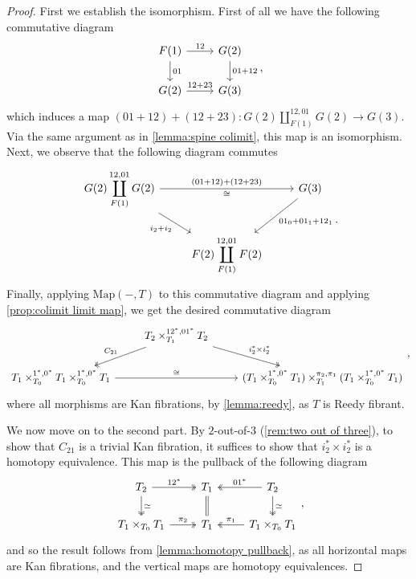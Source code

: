 \documentclass[11pt, a4paper]{amsart}
\newcommand{\Map}{\mathrm{Map}}
\theoremstyle{definition}
\theoremstyle{remark}
\numberwithin{equation}{section}
\begin{document}
\begin{proof}
  First we establish the isomorphism. First of all we have the following commutative diagram
  \[
  \begin{tikzcd}
   F(1) \arrow[r, "12"] \arrow[d, "01"] & G(2) \arrow[d, "01 + 12"] \\
   G(2) \arrow[r, "12 + 23"] & G(3) 
  \end{tikzcd}, 
  \]
  which induces a map $(01 + 12) + (12 + 23)\colon G(2) \coprod^{12,01}_{F(1)} G(2) \to G(3)$. Via the same argument as in \cref{lemma:spine colimit}, this map is an isomorphism. Next, we observe that the following diagram commutes
  \[ 
  \begin{tikzcd}
   \displaystyle G(2) \coprod^{12,01}_{F(1)} G(2) \arrow[dr, "i_2 + i_2"'] \arrow[rr, "\cong"', "(01 + 12) + (12 + 23)"] & & G(3) \arrow[dl, "01_0 + 01_1 + 12_1"] \\ 
   & \displaystyle F(2) \coprod_{F(1)}^{12,01} F(2)  
  \end{tikzcd}.
  \] 
   Finally, applying $\Map(-,T)$ to this commutative diagram and applying \cref{prop:colimit limit map}, we get the desired commutative diagram
 \[
 \begin{tikzcd}
  & T_2 \times_{T_1}^{12^*,01^*} T_2 \arrow[dl, "C_{21}"', twoheadrightarrow] \arrow[dr, "i_2^* \times i_2^*", twoheadrightarrow] & \\ 
  T_1 \times^{1^*,0^*}_{T_0} T_1 \times^{1^*,0^*}_{T_0} T_1 \arrow[rr, "\cong"] & & (T_1 \times^{1^*,0^*}_{T_0} T_1) \times^{\pi_2, \pi_1}_{T_1} (T_1 \times^{1^*,0^*}_{T_0} T_1)
 \end{tikzcd},
 \]
 where all morphisms are Kan fibrations,  by \cref{lemma:reedy}, as $T$ is Reedy fibrant.
 
 We now move on to the second part. By $2$-out-of-$3$ (\cref{rem:two out of three}), to show that $C_{21}$ is a trivial Kan fibration, it suffices to show that $i_2^* \times i_2^*$ is a homotopy equivalence. This map is the pullback of the following diagram 
 \[ 
 \begin{tikzcd}
  T_2 \arrow[r, twoheadrightarrow, "12^*"] \arrow[d, "\simeq", twoheadrightarrow] & T_1 \arrow[d, equal] & T_2 \arrow[l, twoheadrightarrow, "01^*"'] \arrow[d, "\simeq", twoheadrightarrow]\\
  T_1 \times_{T_0} T_1 \arrow[r, twoheadrightarrow, "\pi_2"] & T_1 & T_1 \times_{T_0} T_1 \arrow[l, twoheadrightarrow, "\pi_1"'] 
 \end{tikzcd},
 \]
 and so the result follows from \cref{lemma:homotopy pullback}, as all horizontal maps are Kan fibrations, and the vertical maps are homotopy equivalences. 
\end{proof}
\end{document}
